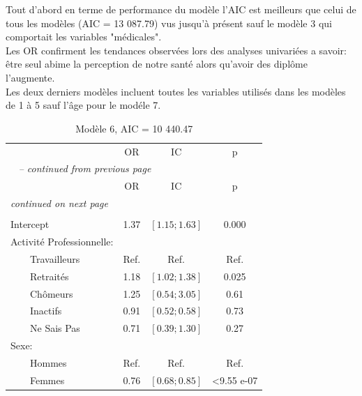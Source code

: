 \documentclass{book}
\begin{document}
\noindent
Tout d'abord en terme de performance du modèle l'AIC est meilleurs que celui de tous les modèles (AIC = 13 087.79) vus jusqu'à présent sauf le modèle 3 qui comportait les variables "médicales".\\
Les OR confirment les tendances observées lors des analyses univariées a savoir: être seul abime la perception de notre santé alors qu'avoir des diplôme l'augmente.\\

\bigskip
\noindent
Les deux derniers modèles incluent toutes les variables utilisés dans les modèles de 1 à 5 sauf l'âge pour le modéle 7.\\
\begin{longtable}{lccc}\caption{Modèle 6, AIC  = 10 440.47}\\
    \hline  
		& \multirow{2}{*}{OR} & \multirow{2}{*}{IC}& \multirow{2}{*}{p}\\ 
		 &    				    &    			    &                  \\ 
   \hline
    \hline     
    \endfirsthead 
    \multicolumn{4}{l}{\tablename\ \thetable{} \textit{-- continued from previous page}}\\ 
    \hline
		& \multirow{2}{*}{OR} & \multirow{2}{*}{IC}& \multirow{2}{*}{p}\\ 
		&    				    &    			    &                  \\ 
    \hline
    \hline  
    \endhead   
    \hline
    \multicolumn{4}{l}{\textit{continued on next page}} \\ 
    \endfoot   
    \multicolumn{4}{l}{}  \\ 
    \endlastfoot  
Intercept & 1.37 & $\left[1.15 ; 1.63 \right]$ & 0.000\\
Activité Professionnelle: &              &              &	\\ 
$\qquad$Travailleurs 		&		Ref.		& 	Ref.		&	Ref.\\ 
$\qquad$Retraités&1.18 &$\left[1.02 ; 1.38 \right]$ & 0.025\\ 
$\qquad$Chômeurs & 1.25& $\left[0.54 ; 3.05\right]$& 0.61\\ 
$\qquad$Inactifs  & 0.91& $\left[0.52 ; 0.58\right]$& 0.73\\ 
$\qquad$Ne Sais Pas & 0.71& $\left[0.39 ; 1.30\right]$ & 0.27 \\ 
Sexe: &              &              &                          \\ 
$\qquad$Hommes &Ref. & Ref.& Ref.\\ 
$\qquad$Femmes & 0.76& $\left[0.68 ; 0.85 \right]$ & <9.55 e-07\\

\end{longtable}
\end{document}
